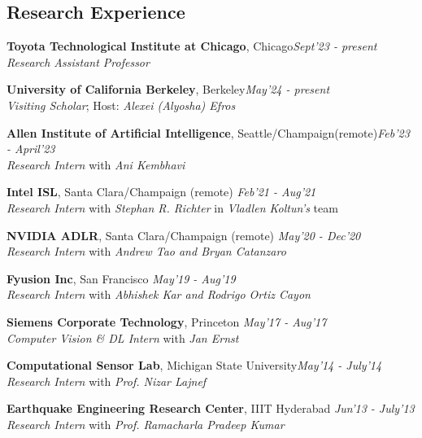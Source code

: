 \documentclass[margin,line]{res}
\newenvironment{list1}{
  \begin{list}{\ding{113}}{%
      \setlength{\itemsep}{0in}
      \setlength{\parsep}{0in} \setlength{\parskip}{0in}
      \setlength{\topsep}{0in} \setlength{\partopsep}{0in} 
      \setlength{\leftmargin}{0.17in}}}{\end{list}}
\begin{document}
\begin{resume}
\section{\sc \large Research Experience}
{\bf Toyota Technological Institute at Chicago}, Chicago\hfill  {\em Sept'23 - present}\\
{\em Research Assistant Professor}  

{\bf University of California Berkeley},  Berkeley\hfill  {\em May'24 - present}\\
{\em Visiting Scholar};   Host: {\em  Alexei (Alyosha) Efros}

{\bf Allen Institute of Artificial Intelligence}, Seattle/Champaign(remote)\hfill  {\em Feb'23 - April'23}\\
{\em Research Intern}  with {\em Ani Kembhavi}


{\bf Intel ISL}, Santa Clara/Champaign (remote) \hfill  {\em Feb'21 - Aug'21}\\
{\em Research Intern} with {\em Stephan R. Richter} in {\em Vladlen Koltun's} team

{\bf NVIDIA ADLR}, Santa Clara/Champaign (remote) \hfill  {\em May'20 - Dec'20}\\
{\em Research Intern}  with {\em Andrew Tao and Bryan Catanzaro}


{\bf Fyusion Inc},  San Francisco \hfill  {\em May'19 - Aug'19}\\
{\em Research Intern}  with {\em Abhishek Kar and Rodrigo Ortiz Cayon}

{\bf Siemens Corporate Technology}, Princeton \hfill  {\em May'17 - Aug'17}\\
{\em Computer Vision \& DL Intern} with  {\em Jan Ernst}

{\bf Computational Sensor Lab}, {Michigan State University}\hfill {\em May'14 - July'14} \\
{\em Research Intern} with {\em Prof. Nizar Lajnef}


{\bf Earthquake Engineering Research Center}, {IIIT Hyderabad} \hfill {\em Jun'13 - July'13} \\
{\em Research Intern} with {\em Prof. Ramacharla Pradeep Kumar}



\end{resume}
\end{document}
